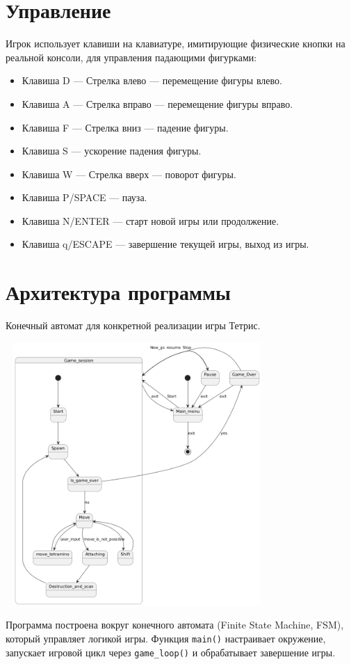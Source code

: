 \documentclass{article}
\begin{document}
\section{Управление}
Игрок использует клавиши на клавиатуре, имитирующие физические кнопки на реальной консоли, для управления падающими фигурками:
\begin{itemize}
    \item Клавиша D — Стрелка влево — перемещение фигуры влево.
    \item Клавиша A — Стрелка вправо — перемещение фигуры вправо.
    \item Клавиша F — Стрелка вниз — падение фигуры.
    \item Клавиша S — ускорение падения фигуры.
    \item Клавиша W — Стрелка вверх — поворот фигуры.
    \item Клавиша P/SPACE — пауза.
    \item Клавиша N/ENTER — старт новой игры или продолжение.
    \item Клавиша q/ESCAPE — завершение текущей игры, выход из игры.
\end{itemize}

\section{Архитектура программы}
Конечный автомат для конкретной реализации игры Тетрис.

\includegraphics[width=10cm, height=10cm]{images/FSM.png}

\noindent Программа построена вокруг конечного автомата (Finite State Machine, FSM), который управляет логикой игры. Функция \texttt{main()} настраивает окружение, запускает игровой цикл через \texttt{game\_loop()} и обрабатывает завершение игры.
\end{document}
